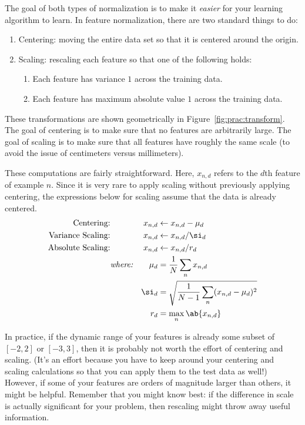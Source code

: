 
The goal of both types of normalization is to make it \emph{easier}
for your learning algorithm to learn.  In feature normalization, there
are two standard things to do:
\begin{enumerate}
\item Centering: moving the entire data set so that it is centered
  around the origin.
\item Scaling: rescaling each feature so that one of the following
  holds:
\begin{enumerate}
\item Each feature has variance $1$ across the training data.
\item Each feature has maximum absolute value $1$ across the training
  data.
\end{enumerate}
\end{enumerate}
These transformations are shown geometrically in
Figure~\ref{fig:prac:transform}.  The goal of centering is to make
sure that no features are arbitrarily large.  The goal of scaling is
to make sure that all features have roughly the same scale (to avoid
the issue of centimeters versus millimeters).


These computations are fairly straightforward.  Here, $x_{n,d}$ refers
to the $d$th feature of example $n$.  Since it is very rare to apply
scaling without previously applying centering, the expressions below
for scaling assume that the data is already centered.
\begin{align}
\text{Centering:} && x_{n,d} &\leftarrow x_{n,d} - \mu_d \\
\text{Variance Scaling:} && x_{n,d} &\leftarrow x_{n,d} / \si_d \\
\text{Absolute Scaling:} && x_{n,d} &\leftarrow x_{n,d} / r_d \\
&\textit{where:}
& \mu_d &= \frac 1 N \sum_n x_{n,d} \\
&& \si_d &= \sqrt{ \frac 1 {N-1} \sum_n (x_{n,d} - \mu_d)^2 } \\
&& r_d   &= \max_n \ab{x_{n,d}}
\end{align}


In practice, if the dynamic range of your features is already some
subset of $[-2,2]$ or $[-3,3]$, then it is probably not worth the
effort of centering and scaling.  (It's an effort because you have to
keep around your centering and scaling calculations so that you can
apply them to the test data as well!)  However, if some of your
features are orders of magnitude larger than others, it might be
helpful.  Remember that you might know best: if the difference in
scale is actually significant for your problem, then rescaling might
throw away useful information.

